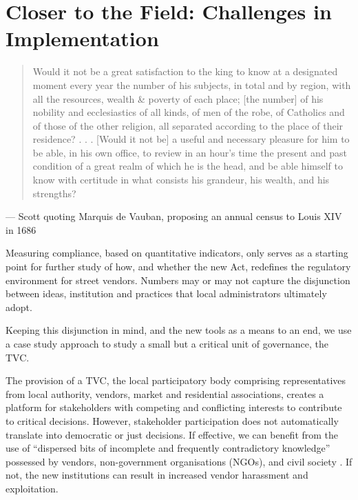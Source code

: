 \documentclass[a4paper, 12pt, twoside]{article}
\begin{document}
{\begin{landscape}
\begin{longtable}
\end{longtable}
\end{landscape}
\normalsize
\section*{Closer to the Field: Challenges in Implementation}

\begin{quote}
Would it not be a great satisfaction to the king to know at a designated moment every year the number of his subjects, in total and by region, with all the resources, wealth \& poverty of each place; [the number] of his nobility and ecclesiastics of all kinds, of men of the robe, of Catholics and of those of the other religion, all separated according to the place of their residence? . . . [Would it not be] a useful and necessary pleasure for him to be able, in his own office, to review in an hour’s time the present and past condition of a great realm of which he is the head, and be able himself to know with certitude in what consists his grandeur, his wealth, and his strengths?
\end{quote}
— Scott \cite*{scottbook} quoting Marquis de Vauban, proposing an annual census to Louis XIV in 1686

Measuring compliance, based on quantitative indicators, only serves as a starting point for further study of how, and whether the new Act, redefines the regulatory environment for street vendors. Numbers may or may not capture the disjunction between ideas, institution and practices that local administrators ultimately adopt.

Keeping this disjunction in mind, and the new tools as a means to an end, we use a case study approach to study a small but a critical unit of governance, the TVC.

The provision of a TVC, the local participatory body comprising representatives from local authority, vendors, market and residential associations, creates a platform for stakeholders with competing and conflicting interests to contribute to critical decisions. However, stakeholder participation does not automatically translate into democratic or just decisions. If effective, we can benefit from the use of “dispersed bits of incomplete and frequently contradictory knowledge” possessed by vendors, non-government organisations (NGOs), and civil society \parencite{hayekpaper}. If not, the new institutions can result in increased vendor harassment and exploitation.

}
\end{document}
